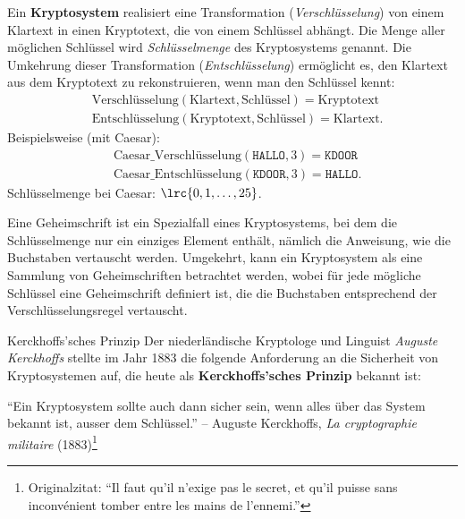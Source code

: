 \begin{frame}\leavevmode
{\small
\begin{mydefinition}[Kryptosystem]\label{mydefinition:kryptosystem}
	Ein \textbf{Kryptosystem} realisiert eine Transformation (\emph{Verschlüsselung}) von einem Klartext in einen Kryptotext, die von einem Schlüssel abhängt. 
	Die Menge aller möglichen Schlüssel wird \emph{Schlüsselmenge} des Kryptosystems genannt.
	Die Umkehrung dieser Transformation (\emph{Entschlüsselung}) ermöglicht es, den Klartext aus dem Kryptotext zu rekonstruieren, wenn man den Schlüssel kennt:
	\begin{align*}
		&\text{Verschlüsselung}(\text{Klartext}, \text{Schlüssel}) = \text{Kryptotext} \\
		&\text{Entschlüsselung}(\text{Kryptotext}, \text{Schlüssel}) = \text{Klartext}.
	\end{align*}
	Beispielsweise (mit Caesar):
	\begin{align*}
		&\text{Caesar\_Verschlüsselung}(\texttt{HALLO}, 3) = \texttt{KDOOR} \\
		&\text{Caesar\_Entschlüsselung}(\texttt{KDOOR}, 3) = \texttt{HALLO}.
	\end{align*}
	Schlüsselmenge bei Caesar: $\lrc{0, 1, \dots, 25}$.	
\end{mydefinition}
}
\end{frame}


\begin{frame}
    \begin{myremark}
        Eine Geheimschrift ist ein Spezialfall eines Kryptosystems, bei dem die Schlüsselmenge nur ein einziges Element enthält, nämlich die Anweisung, wie die Buchstaben vertauscht werden. 
        Umgekehrt, kann ein Kryptosystem als eine Sammlung von Geheimschriften betrachtet werden, wobei für jede mögliche Schlüssel eine Geheimschrift definiert ist, die die Buchstaben entsprechend der Verschlüsselungsregel vertauscht.
    \end{myremark}
\end{frame}


\begin{frame}[fragile]{Kerckhoffs'sches Prinzip}
Der niederländische Kryptologe und Linguist \emph{Auguste Kerckhoffs} stellte im Jahr 1883 die folgende Anforderung an die Sicherheit von Kryptosystemen auf, die heute als \textbf{Kerckhoffs'sches Prinzip} bekannt ist: 

\begin{myquote}\label{myquote:kerckhoffs}
	\enquote{Ein Kryptosystem sollte auch dann sicher sein, wenn alles über das System bekannt ist, ausser dem Schlüssel.} -- Auguste Kerckhoffs, \emph{La cryptographie militaire} (1883)\footnote{Originalzitat: \enquote{Il faut qu'il n'exige pas le secret, et qu'il puisse sans inconvénient tomber entre les mains de l'ennemi.}}
\end{myquote}
\end{frame}


